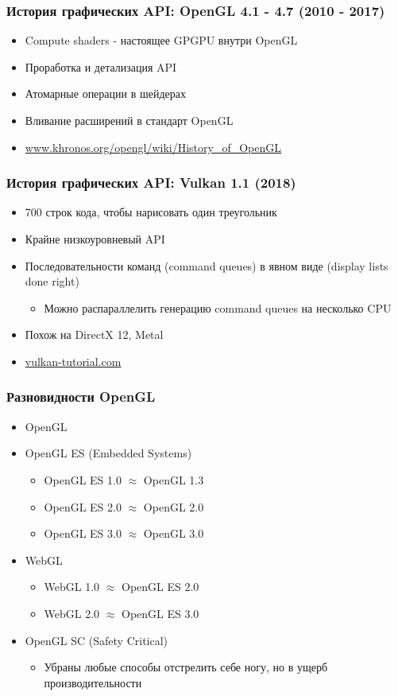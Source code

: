 \documentclass{beamer}
\begin{document}
\begin{frame}
\frametitle{История графических API: OpenGL 4.1 - 4.7 (2010 - 2017)}
\begin{itemize}
\item Compute shaders - настоящее GPGPU внутри OpenGL
\item Проработка и детализация API
\item Атомарные операции в шейдерах
\item Вливание расширений в стандарт OpenGL
\item \url{www.khronos.org/opengl/wiki/History_of_OpenGL}
\end{itemize}
\end{frame}

\begin{frame}
\frametitle{История графических API: Vulkan 1.1 (2018)}
\begin{itemize}
\item 700 строк кода, чтобы нарисовать один треугольник
\pause
\item Крайне низкоуровневый API
\item Последовательности команд (command queues) в явном виде (display lists done right)
\begin{itemize}
\item Можно распараллелить генерацию command queues на несколько CPU
\end{itemize}
\pause
\item Похож на DirectX 12, Metal
\item \url{vulkan-tutorial.com}
\end{itemize}
\end{frame}

\begin{frame}
\frametitle{Разновидности OpenGL}
\begin{itemize}
\item OpenGL
\pause
\item OpenGL ES (Embedded Systems)
\begin{itemize}
\item OpenGL ES 1.0 $\approx$ OpenGL 1.3
\item OpenGL ES 2.0 $\approx$ OpenGL 2.0
\item OpenGL ES 3.0 $\approx$ OpenGL 3.0
\end{itemize}
\pause
\item WebGL
\begin{itemize}
\item WebGL 1.0 $\approx$ OpenGL ES 2.0
\item WebGL 2.0 $\approx$ OpenGL ES 3.0
\end{itemize}
\pause
\item OpenGL SC (Safety Critical)
\begin{itemize}
\item Убраны любые способы отстрелить себе ногу, но в ущерб производительности
\end{itemize}
\end{itemize}
\end{frame}
\end{document}
